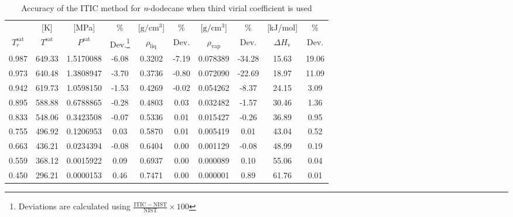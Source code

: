 \documentclass[%
 aip,
 jcp,
 sd,%
 amsmath,amssymb,
 reprint,%
]{revtex4-1}
\begin{document}
\begin{table}[]
\centering
\caption{Accuracy of the ITIC method for \textit{n}-dodecane when third virial coefficient is used}
\label{tab:NIST-VAL-C12-FTT}
\begin{ruledtabular}
\begin{tabular}{cccccccccc}
 & {[}K{]} &	 {[}MPa{]} &	 \% 	& {[}$\mathrm{g/cm^3}${]} & \% & {[}$\mathrm{g/cm^3}${]} & \% 	& {[}kJ/mol{]} & \% \\
$T_r^{\mathrm{sat}}$ & $T^{\mathrm{sat}}$ & $P^{\mathrm{sat}}$ & Dev.\footnote{Deviations are calculated using $\frac{\mathrm{ITIC - NIST}}{\mathrm{NIST}} \times 100$} & $\rho_{\mathrm{liq}}$ &	 Dev. & $\rho_{\mathrm{vap}}$ & Dev. & $\Delta H_{\mathrm{v}}$ & Dev. \\
\hline
0.987 & 649.33    & 1.5170088 & -6.08   & 0.3202     & -7.19   & 0.078389        & -34.28  & 15.63        & 19.06   \\
0.973 & 640.48    & 1.3808947 & -3.70   & 0.3736     & -0.80   & 0.072090        & -22.69  & 18.97        & 11.09   \\
0.942 & 619.73    & 1.0598150 & -1.53   & 0.4269     & -0.02   & 0.054262        & -8.37   & 24.15        & 3.09    \\
0.895 & 588.88    & 0.6788865 & -0.28   & 0.4803     & 0.03    & 0.032482        & -1.57   & 30.46        & 1.36    \\
0.833 & 548.06    & 0.3423508 & -0.07   & 0.5336     & 0.01    & 0.015427        & -0.26   & 36.89        & 0.95    \\
0.755 & 496.92    & 0.1206953 & 0.03    & 0.5870     & 0.01    & 0.005419        & 0.01    & 43.04        & 0.52    \\
0.663 & 436.21    & 0.0234394 & -0.08   & 0.6404     & 0.00    & 0.001129        & -0.08   & 48.99        & 0.19    \\
0.559 & 368.12    & 0.0015922 & 0.09    & 0.6937     & 0.00    & 0.000089        & 0.10    & 55.06        & 0.04    \\
0.450 & 296.21    & 0.0000153 & 0.46    & 0.7471     & 0.00    & 0.000001        & 0.89    & 61.76        & 0.01    \\ 			
\end{tabular}
\end{ruledtabular}
\end{table}
\end{document}
